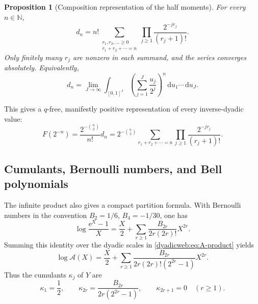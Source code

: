 \documentclass[11pt,oneside]{article}
\newtheorem{proposition}[theorem]{Proposition}
\theoremstyle{definition}
\theoremstyle{remark}
\newcommand{\N}{\mathbb N}
\newcommand{\e}{\mathrm e}
\newcommand{\dd}{\,\mathrm d}
\begin{document}
\begin{proposition}[Composition representation of the half moments]
\label{dyadicweb:prop:composition-d}
For every $n\in\N$,
\begin{equation}
 d_n=n!\!
 \sum_{\substack{r_1,r_2,\ldots\ge0\\r_1+r_2+\cdots=n}}
 \prod_{j\ge1}\frac{2^{-jr_j}}{(r_j+1)!}.                 \label{dyadicweb:eq:composition-d}
\end{equation}
Only finitely many $r_j$ are nonzero in each summand, and the series converges absolutely.
Equivalently,
\begin{equation}
 d_n=\lim_{J\to\infty}\int_{[0,1]^J}
       \left(\sum_{j=1}^{J}\frac{u_j}{2^j}\right)^n
       \dd u_1\cdots\dd u_J.                              \label{dyadicweb:eq:cube-d}
\end{equation}
\end{proposition}

This gives a $q$-free, manifestly positive representation of every inverse-dyadic value:
\begin{equation}
 F(2^{-n})=\frac{2^{-\binom n2}}{n!}d_n
 =2^{-\binom n2}
 \sum_{r_1+r_2+\cdots=n}
 \prod_{j\ge1}\frac{2^{-jr_j}}{(r_j+1)!}.                \label{dyadicweb:eq:inverse-composition}
\end{equation}

\subsection{Cumulants, Bernoulli numbers, and Bell polynomials}

The infinite product also gives a compact partition formula.  With Bernoulli numbers in the
convention $B_2=1/6$, $B_4=-1/30$, one has
\begin{equation}
 \log\frac{\e^X-1}{X}
 =\frac X2+\sum_{r\ge1}\frac{B_{2r}}{2r(2r)!}X^{2r}.      \label{dyadicweb:eq:log-exprel}
\end{equation}
Summing this identity over the dyadic scales in \eqref{dyadicweb:eq:A-product} yields
\begin{equation}
 \log\mathscr A(X)
 =\frac X2+
  \sum_{r\ge1}
  \frac{B_{2r}}{2r(2r)!(2^{2r}-1)}X^{2r}.                 \label{dyadicweb:eq:log-A}
\end{equation}
Thus the cumulants $\kappa_j$ of $Y$ are
\begin{equation}
 \kappa_1=\frac12,\qquad
 \kappa_{2r}=\frac{B_{2r}}{2r(2^{2r}-1)},\qquad
 \kappa_{2r+1}=0\quad(r\ge1).                            \label{dyadicweb:eq:Y-cumulants}
\end{equation}
\end{document}

